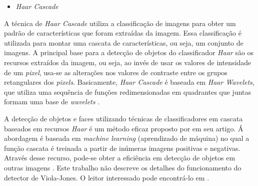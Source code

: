 \begin{itemize}
\raggedright \item \label{itm:haarcascade} \textit{Haar Cascade}
\end{itemize}
 
A técnica de \textit{Haar Cascade} utiliza a classificação de imagens para obter um padrão de características que foram extraídas da imagem. Essa classificação é utilizada para montar uma cascata de características, ou seja, um conjunto de imagens. A principal base para a detecção de objetos do classificador \textit{Haar} são os recursos extraídos da imagem, ou seja, ao invés de usar os valores de intensidade de um \textit{pixel}, usa-se as alterações nos valores de contraste entre os grupos retangulares dos \textit{pixels}. Basicamente, \textit{Haar Cascade} é baseada em \textit{Haar Wavelets}, que utiliza uma sequência de funções redimensionadas em quadrantes que juntas formam uma base de \textit{wavelets} \cite{WILSON2006}.

A detecção de objetos e faces utilizando técnicas de classificadores em cascata baseados em recursos \textit{Haar} é um método eficaz proposto por  em seu artigo. Á abordagem é baseada em \textit{machine learning} (aprendizado de máquina) no qual a função cascata é treinada a partir de inúmeras imagens positivas e negativas. Através desse recurso, pode-se obter a eficiência em detecção de objetos em outras imagens \cite{OpenCV}. Este trabalho não descreve os detalhes do funcionamento do detector de Viola-Jones. O leitor interessado pode encontrá-lo em \cite{VIOLA2001}.